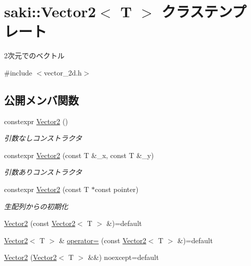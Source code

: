 \hypertarget{classsaki_1_1_vector2}{}\section{saki\+:\+:Vector2$<$ T $>$ クラステンプレート}
\label{classsaki_1_1_vector2}


2次元でのベクトル  




{\ttfamily \#include $<$vector\+\_\+2d.\+h$>$}

\subsection*{公開メンバ関数}
\begin{DoxyCompactItemize}
\item 
constexpr \mbox{\hyperlink{classsaki_1_1_vector2_af57b72f4255812a361bef1922a226f86}{Vector2}} ()
\begin{DoxyCompactList}\small\item\em 引数なしコンストラクタ \end{DoxyCompactList}\item 
constexpr \mbox{\hyperlink{classsaki_1_1_vector2_ad0f3d0a05370f1ef4947520245f6e9a8}{Vector2}} (const T \&\+\_\+x, const T \&\+\_\+y)
\begin{DoxyCompactList}\small\item\em 引数ありコンストラクタ \end{DoxyCompactList}\item 
constexpr \mbox{\hyperlink{classsaki_1_1_vector2_ad2c0fd66544f68066179490647244b14}{Vector2}} (const T $\ast$const pointer)
\begin{DoxyCompactList}\small\item\em 生配列からの初期化 \end{DoxyCompactList}\item 
\mbox{\hyperlink{classsaki_1_1_vector2_af3d61bb90047a8621cba0a17b265bfaa}{Vector2}} (const \mbox{\hyperlink{classsaki_1_1_vector2}{Vector2}}$<$ T $>$ \&)=default
\item 
\mbox{\hyperlink{classsaki_1_1_vector2}{Vector2}}$<$ T $>$ \& \mbox{\hyperlink{classsaki_1_1_vector2_ae6ee2a6387bfe58bdd5bf74d388370a9}{operator=}} (const \mbox{\hyperlink{classsaki_1_1_vector2}{Vector2}}$<$ T $>$ \&)=default
\item 
\mbox{\hyperlink{classsaki_1_1_vector2_ade059efe536b29346642aacbd973d062}{Vector2}} (\mbox{\hyperlink{classsaki_1_1_vector2}{Vector2}}$<$ T $>$ \&\&) noexcept=default

\end{DoxyCompactItemize}
